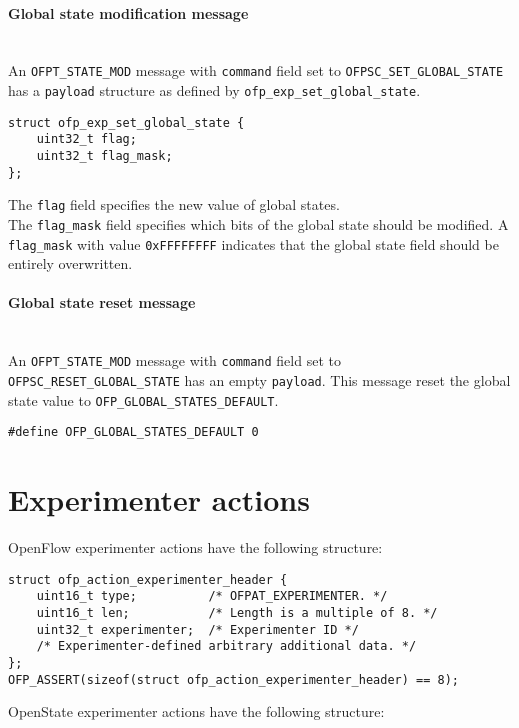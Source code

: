 \paragraph{Global state modification message}\mbox{}\\
An \texttt{OFPT\_STATE\_MOD} message with \texttt{command} field set to \texttt{OFPSC\_SET\_GLOBAL\_STATE} has a \texttt{payload} structure as defined by \texttt{ofp\_exp\_set\_global\_state}.

\scriptsize\begin{verbatim}
struct ofp_exp_set_global_state {
    uint32_t flag;
    uint32_t flag_mask;
};
\end{verbatim}\normalsize
The \texttt{flag} field specifies the new value of global states.
\\
The \texttt{flag\_mask} field specifies which bits of the global state should be modified. A \texttt{flag\_mask} with value \texttt{0xFFFFFFFF} indicates that the global state field should be entirely overwritten.

\paragraph{Global state reset message}\mbox{}\\
An \texttt{OFPT\_STATE\_MOD} message with \texttt{command} field set to \texttt{OFPSC\_RESET\_GLOBAL\_STATE} has an empty \texttt{payload}.
This message reset the global state value to \texttt{OFP\_GLOBAL\_STATES\_DEFAULT}.

\scriptsize\begin{verbatim}
#define OFP_GLOBAL_STATES_DEFAULT 0
\end{verbatim}\normalsize


\section{Experimenter actions}

OpenFlow experimenter actions have the following structure:

\scriptsize\begin{verbatim}
struct ofp_action_experimenter_header {
    uint16_t type;          /* OFPAT_EXPERIMENTER. */
    uint16_t len;           /* Length is a multiple of 8. */
    uint32_t experimenter;  /* Experimenter ID */
    /* Experimenter-defined arbitrary additional data. */
};
OFP_ASSERT(sizeof(struct ofp_action_experimenter_header) == 8);
\end{verbatim}\normalsize
OpenState experimenter actions have the following structure:

